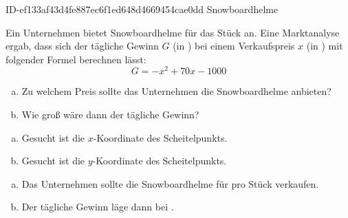 \begin{exercise}
      {ID-ef133af43d4fe887ec6f1ed648d4669454cae0dd}
      {Snowboardhelme}
  \ifproblem\problem\par
    Ein Unternehmen bietet Snowboardhelme für  das Stück an. Eine
    Marktanalyse ergab, dass sich der tägliche Gewinn $G$ (in \officialeuro)
    bei einem Verkaufspreis $x$ (in \officialeuro) mit folgender Formel
    berechnen lässt:
    \begin{equation*}
      G=-x^{2}+70x-1000
    \end{equation*}
    \begin{enumerate}[a)]
      \item Zu welchem Preis sollte das Unternehmen die Snowboardhelme
            anbieten?
      \item Wie groß wäre dann der tägliche Gewinn?
    \end{enumerate}
  \fi
  \ifoutline\outline\par
    \begin{enumerate}[a)]
      \item Gesucht ist die $x$-Koordinate des Scheitelpunkts.
      \item Gesucht ist die $y$-Koordinate des Scheitelpunkts.
    \end{enumerate}
  \fi
  \ifoutcome\outcome\par
    \begin{enumerate}[a)]
      \item Das Unternehmen sollte die Snowboardhelme für  pro Stück verkaufen.
      \item Der tägliche Gewinn läge dann bei .
    \end{enumerate}
  \fi
\end{exercise}
